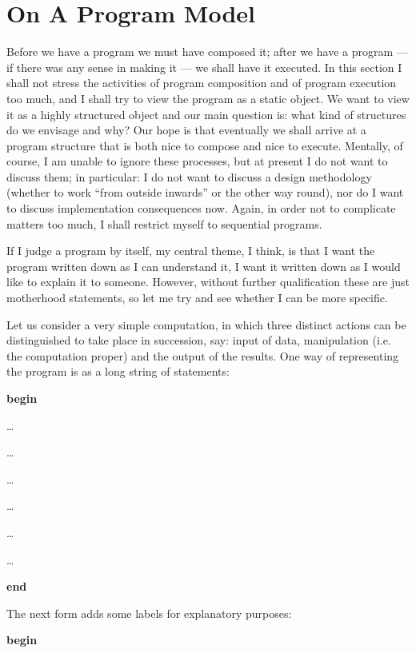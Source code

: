 \section[On a program model]{On A Program Model}
\label{eq:program-model}

Before we have a program we must have composed it; after we have a program --- if there was any sense in making it --- we shall have it executed. In this section I shall not stress the activities of program composition and of program execution too much, and I shall try to view the program as a static object. We want to view it as a highly structured object and our main question is: what kind of structures do we envisage and why? Our hope is that eventually we shall arrive at a program structure that is both nice to compose and nice to execute. Mentally, of course, I am unable to ignore these processes, but at present I do not want to discuss them; in particular: I do not want to discuss a design methodology (whether to work ``from outside inwards'' or the other way round), nor do I want to discuss implementation consequences now. Again, in order not to complicate matters too much, I shall restrict myself to sequential programs.

If I judge a program by itself, my central theme, I think, is that I want the program written down as I can understand it, I want it written down as I would like to explain it to someone. However, without further qualification these are just motherhood statements, so let me try and see whether I can be more specific.

Let us consider a very simple computation, in which three distinct actions can be distinguished to take place in succession, say: input of data, manipulation (i.e. the computation proper) and the output of the results. One way of representing the program is as a long string of statements:

\noindent
\textbf{begin}

\noindent
\quad\dots

\noindent
\quad\dots

\noindent
\quad\dots

\noindent
\quad\dots

\noindent
\quad\dots

\noindent
\quad\dots

\noindent
\textbf{end}

The next form adds some labels for explanatory purposes:

\noindent
\tabto{10em}\textbf{begin}
\nopagebreak

